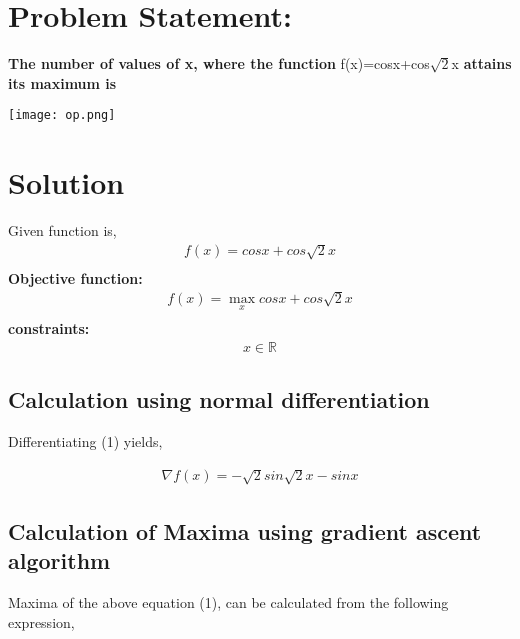 \documentclass[10pt,a4paper]{report}
\begin{document}
\begin{multicols}{2}

\raggedright 
\section*{\large Problem Statement:}
\textbf{ The number of values of x, where the function} f(x)=cosx+cos$\sqrt{2}$x \textbf{attains its maximum is}\\
\vspace{5mm}
\begin{center}
\texttt{[image: op.png]} \\
\end{center} 
\section*{\large Solution}
 Given function is,
 \begin{align}
	\label{eq:vol_varx}
	f(x) = cosx+cos\sqrt{2}x\\
	\end{align}
	\textbf{Objective function:}
	\begin{align}
	f(x)=\max_x cosx+cos\sqrt{2}x\\
        \end{align}
	\textbf{constraints:}\\
	\begin{align}
		x \in \mathbb{R}
	\end{align}
	\subsection*{Calculation using normal differentiation}
\begin{flushleft}
Differentiating (1) yields,
\end{flushleft}
\begin{align}
\nabla f(x) =-\sqrt{2} sin\sqrt{2}x-sinx
\end{align}
\begin{flushleft}
\subsection*{Calculation of Maxima using gradient ascent algorithm}
\end{flushleft}
\begin{flushleft}
Maxima of the above equation (1), can be calculated from the following expression,\\
\end{flushleft}


\end{multicols}
\end{document}
